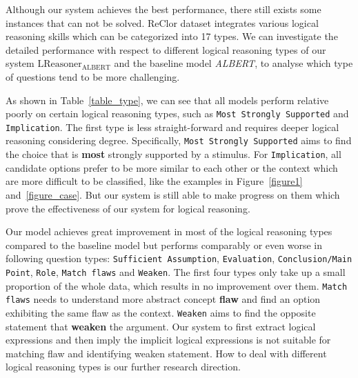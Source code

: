 \documentclass[11pt,a4paper]{article}
\begin{document}
Although our system achieves the best performance, there still exists some instances that can not be solved. 
ReClor dataset integrates various logical reasoning skills which can be categorized into 17 types. We can investigate the detailed performance with respect to different logical reasoning types of our system \emph{$\text{LReasoner}_{\text{ALBERT}}$} and the baseline model \emph{ALBERT}, to analyse which type of questions tend to be more challenging.


As shown in Table~\ref{table_type}, we can see that all models perform relative poorly on certain logical reasoning types, such as \texttt{Most Strongly Supported} and \texttt{Implication}. The first type is less straight-forward and requires deeper logical reasoning considering degree. Specifically, \texttt{Most Strongly Supported} aims to find the choice that is \textbf{most} strongly supported by a stimulus. For \texttt{Implication}, all candidate options prefer to be more similar to each other or the context which are more difficult to be classified, like the examples in Figure~\ref{figure1} and~\ref{figure_case}. But our system is still able to make progress on them which prove the effectiveness of our system for logical reasoning.

Our model achieves great improvement in most of the logical reasoning types compared to the baseline model but performs comparably or even worse in following question types: \texttt{Sufficient Assumption}, \texttt{Evaluation}, \texttt{Conclusion/Main Point}, \texttt{Role}, \texttt{Match flaws} and \texttt{Weaken}. The first four types only take up a small proportion of the whole data, which results in no improvement over them. 
\texttt{Match flaws} needs to understand more abstract concept \textbf{flaw} and find an option exhibiting the same flaw as the context.
\texttt{Weaken} aims to find the opposite statement that \textbf{weaken} the argument.
Our system to first extract logical expressions and then imply the implicit logical expressions is not suitable for matching flaw and identifying weaken statement.
How to deal with different logical reasoning types is our further research direction.
\end{document}
